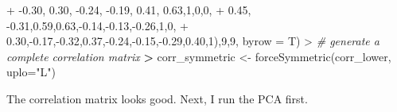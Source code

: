 \documentclass[
]{article}
\newenvironment{Shaded}{\begin{snugshade}}{\end{snugshade}}
\newcommand{\AttributeTok}[1]{\textcolor[rgb]{0.77,0.63,0.00}{#1}}
\newcommand{\CommentTok}[1]{\textcolor[rgb]{0.56,0.35,0.01}{\textit{#1}}}
\newcommand{\DecValTok}[1]{\textcolor[rgb]{0.00,0.00,0.81}{#1}}
\newcommand{\ErrorTok}[1]{\textcolor[rgb]{0.64,0.00,0.00}{\textbf{#1}}}
\newcommand{\FloatTok}[1]{\textcolor[rgb]{0.00,0.00,0.81}{#1}}
\newcommand{\FunctionTok}[1]{\textcolor[rgb]{0.00,0.00,0.00}{#1}}
\newcommand{\NormalTok}[1]{#1}
\newcommand{\OtherTok}[1]{\textcolor[rgb]{0.56,0.35,0.01}{#1}}
\newcommand{\SpecialCharTok}[1]{\textcolor[rgb]{0.00,0.00,0.00}{#1}}
\newcommand{\StringTok}[1]{\textcolor[rgb]{0.31,0.60,0.02}{#1}}
\begin{document}
\begin{Shaded}
\begin{Highlighting}[]
\SpecialCharTok{+}                       \SpecialCharTok{{-}}\FloatTok{0.30}\NormalTok{, }\FloatTok{0.30}\NormalTok{, }\SpecialCharTok{{-}}\FloatTok{0.24}\NormalTok{, }\SpecialCharTok{{-}}\FloatTok{0.19}\NormalTok{, }\FloatTok{0.41}\NormalTok{, }\FloatTok{0.63}\NormalTok{,}\DecValTok{1}\NormalTok{,}\DecValTok{0}\NormalTok{,}\DecValTok{0}\NormalTok{, }
\SpecialCharTok{+}                       \FloatTok{0.45}\NormalTok{, }\SpecialCharTok{{-}}\FloatTok{0.31}\NormalTok{,}\FloatTok{0.59}\NormalTok{,}\FloatTok{0.63}\NormalTok{,}\SpecialCharTok{{-}}\FloatTok{0.14}\NormalTok{,}\SpecialCharTok{{-}}\FloatTok{0.13}\NormalTok{,}\SpecialCharTok{{-}}\FloatTok{0.26}\NormalTok{,}\DecValTok{1}\NormalTok{,}\DecValTok{0}\NormalTok{,}
\SpecialCharTok{+}                       \FloatTok{0.30}\NormalTok{,}\SpecialCharTok{{-}}\FloatTok{0.17}\NormalTok{,}\SpecialCharTok{{-}}\FloatTok{0.32}\NormalTok{,}\FloatTok{0.37}\NormalTok{,}\SpecialCharTok{{-}}\FloatTok{0.24}\NormalTok{,}\SpecialCharTok{{-}}\FloatTok{0.15}\NormalTok{,}\SpecialCharTok{{-}}\FloatTok{0.29}\NormalTok{,}\FloatTok{0.40}\NormalTok{,}\DecValTok{1}\NormalTok{),}\DecValTok{9}\NormalTok{,}\DecValTok{9}\NormalTok{, }\AttributeTok{byrow =}\NormalTok{ T)}
\SpecialCharTok{\textgreater{}} \CommentTok{\# generate a complete correlation matrix}
\ErrorTok{\textgreater{}}\NormalTok{ corr\_symmetric }\OtherTok{\textless{}{-}} \FunctionTok{forceSymmetric}\NormalTok{(corr\_lower, }\AttributeTok{uplo=}\StringTok{"L"}\NormalTok{)}
\end{Highlighting}
\end{Shaded}

The correlation matrix looks good. Next, I run the PCA first.
\end{document}
